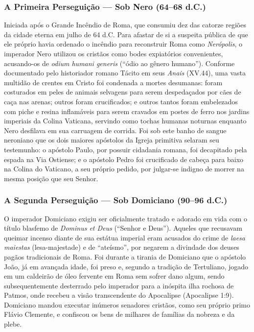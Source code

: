 \documentclass[11pt,a4paper,openany]{book}
\begin{document}
\subsubsection*{A Primeira Perseguição — Sob Nero (64–68 d.C.)}
Iniciada após o Grande Incêndio de Roma, que consumiu dez das catorze regiões da cidade eterna em julho de 64 d.C. Para afastar de si a suspeita pública de que ele próprio havia ordenado o incêndio para reconstruir Roma como \textit{Nerópolis}, o imperador Nero utilizou os cristãos como bodes expiatórios convenientes, acusando-os de \textit{odium humani generis} (``ódio ao gênero humano''). Conforme documentado pelo historiador romano Tácito em seus \textit{Anais} (XV.44), uma vasta multidão de crentes em Cristo foi condenada a mortes desumanas: foram costurados em peles de animais selvagens para serem despedaçados por cães de caça nas arenas; outros foram crucificados; e outros tantos foram embelezados com piche e resina inflamáveis para serem cravados em postes de ferro nos jardins imperiais da Colina Vaticana, servindo como tochas humanas noturnas enquanto Nero desfilava em sua carruagem de corrida. Foi sob este banho de sangue neroniano que os dois maiores apóstolos da Igreja primitiva selaram seu testemunho: o apóstolo Paulo, por possuir cidadania romana, foi decapitado pela espada na Via Ostiense; e o apóstolo Pedro foi crucificado de cabeça para baixo na Colina do Vaticano, a seu próprio pedido, por julgar-se indigno de morrer na mesma posição que seu Senhor.


\subsubsection*{A Segunda Perseguição — Sob Domiciano (90–96 d.C.)}
O imperador Domiciano exigiu ser oficialmente tratado e adorado em vida com o título blasfemo de \textit{Dominus et Deus} (``Senhor e Deus''). Aqueles que recusavam queimar incenso diante de sua estátua imperial eram acusados do crime de \textit{laesa maiestas} (lesa-majestade) e de ``ateísmo'', por negarem a divindade dos deuses pagãos tradicionais de Roma. Foi durante a tirania de Domiciano que o apóstolo João, já em avançada idade, foi preso e, segundo a tradição de Tertuliano, jogado em um caldeirão de óleo fervente em Roma sem sofrer dano algum, sendo subsequentemente desterrado pelo imperador para a inóspita ilha rochosa de Patmos, onde recebeu a visão transcendente do Apocalipse (Apocalipse 1:9). Domiciano mandou executar inúmeros senadores cristãos, como seu próprio primo Flávio Clemente, e confiscou os bens de milhares de famílias da nobreza e da plebe.
\end{document}
